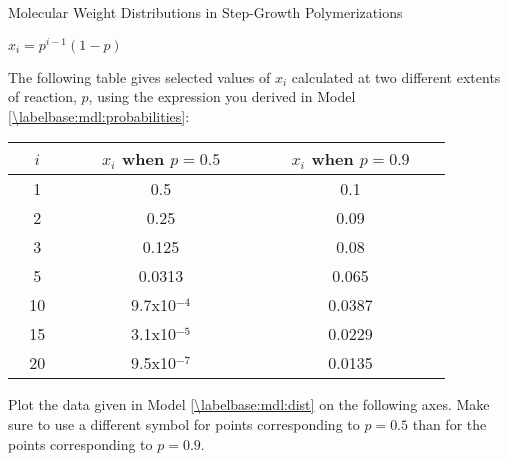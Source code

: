 \begin{activity}{Molecular Weight Distributions in Step-Growth Polymerizations}
\begin{ctqs}
		\begin{solution}[0.5in]
		
			$x_i = p^{i-1}(1-p)$
			
		\end{solution}
		
\end{ctqs}

\begin{model}
\label{\labelbase:mdl:dist}

	The following table gives selected values of $x_i$ calculated at two different extents of reaction, $p$, using the expression you derived in Model \ref{\labelbase:mdl:probabilities}:
	
		\begin{center}
			\renewcommand{\arraystretch}{1.5}
			\begin{tabular}{ccc}
				\hline
				\textbf{~~$i$~~} & ~~~$x_i$ when $p=0.5$~~~ & ~~~$x_i$ when $p=0.9$~~~ \\\hline
				1 & 0.5 & 0.1 \\
				2 & 0.25 & 0.09 \\
				3 & 0.125 & 0.08 \\
				5 & 0.0313 & 0.065 \\
				10 & 9.7x10$^{-4}$ & 0.0387 \\
				15 & 3.1x10$^{-5}$ & 0.0229 \\
				20 & 9.5x10$^{-7}$ & 0.0135 \\\hline
			\end{tabular}
		\end{center}
		
		\vspace{0.1in}

\end{model}
	
\begin{ctqs}

	\question Plot the data given in Model \ref{\labelbase:mdl:dist} on the following axes.  Make sure to use a different symbol for points corresponding to $p=0.5$ than for the points corresponding to $p=0.9$.
	
		\begin{solution}[3.25in]
		\end{solution}
	

\end{ctqs}
\end{activity}
